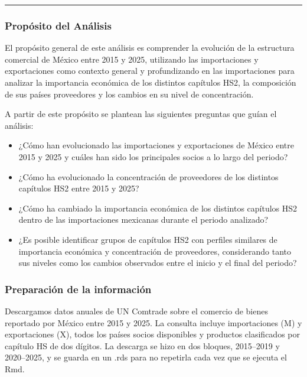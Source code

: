 \documentclass[
]{article}
\begin{document}
\begin{center}\rule{0.5\linewidth}{0.5pt}\end{center}

\subsubsection{Propósito del
Análisis}\label{propuxf3sito-del-anuxe1lisis}

El propósito general de este análisis es comprender la evolución de la
estructura comercial de México entre 2015 y 2025, utilizando las
importaciones y exportaciones como contexto general y profundizando en
las importaciones para analizar la importancia económica de los
distintos capítulos HS2, la composición de sus países proveedores y los
cambios en su nivel de concentración.

A partir de este propósito se plantean las siguientes preguntas que
guían el análisis:

\begin{itemize}
\item
  ¿Cómo han evolucionado las importaciones y exportaciones de México
  entre 2015 y 2025 y cuáles han sido los principales socios a lo largo
  del periodo?
\item
  ¿Cómo ha evolucionado la concentración de proveedores de los distintos
  capítulos HS2 entre 2015 y 2025?
\item
  ¿Cómo ha cambiado la importancia económica de los distintos capítulos
  HS2 dentro de las importaciones mexicanas durante el periodo
  analizado?
\item
  ¿Es posible identificar grupos de capítulos HS2 con perfiles similares
  de importancia económica y concentración de proveedores, considerando
  tanto sus niveles como los cambios observados entre el inicio y el
  final del periodo?
\end{itemize}

\subsubsection{Preparación de la
información}\label{preparaciuxf3n-de-la-informaciuxf3n}

Descargamos datos anuales de UN Comtrade sobre el comercio de bienes
reportado por México entre 2015 y 2025. La consulta incluye
importaciones (M) y exportaciones (X), todos los países socios
disponibles y productos clasificados por capítulo HS de dos dígitos. La
descarga se hizo en dos bloques, 2015--2019 y 2020--2025, y se guarda en
un .rds para no repetirla cada vez que se ejecuta el Rmd.
\end{document}

